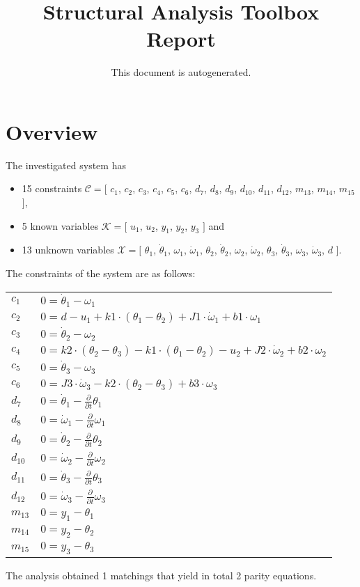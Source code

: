 \documentclass[a4,11pt]{article}
\title{Structural Analysis Toolbox Report}
\author{This document is autogenerated.}
\begin{document}
\maketitle
\section{Overview}
The investigated system has
\begin{itemize}
	\item 15 constraints $\mathcal{C} = [$ $c_1$, $c_2$, $c_3$, $c_4$, $c_5$, $c_6$, $d_7$, $d_8$, $d_9$, $d_{10}$, $d_{11}$, $d_{12}$, $m_{13}$, $m_{14}$, $m_{15}$ $]$,
	\item 5 known variables $\mathcal{K} = [$ $u_1$, $u_2$, $y_1$, $y_2$, $y_3$ $]$ and
	\item 13 unknown variables $\mathcal{X} = [$ $\theta_1$, $\dot{\theta}_1$, $\omega_1$, $\dot{\omega}_1$, $\theta_2$, $\dot{\theta}_2$, $\omega_2$, $\dot{\omega}_2$, $\theta_3$, $\dot{\theta}_3$, $\omega_3$, $\dot{\omega}_3$, $d$ $]$.
\end{itemize}
The constraints of the system are as follows:
\begin{longtable}{ l | p{} }
	$c_1$ & $ 0=\dot{\theta}_1-\omega_1 $ \\
	$c_2$ & $ 0=d-u_1+k1\cdot \left(\theta_1-\theta_2\right)+J1\cdot \dot{\omega}_1+b1\cdot \omega_1 $ \\
	$c_3$ & $ 0=\dot{\theta}_2-\omega_2 $ \\
	$c_4$ & $ 0=k2\cdot \left(\theta_2-\theta_3\right)-k1\cdot \left(\theta_1-\theta_2\right)-u_2+J2\cdot \dot{\omega}_2+b2\cdot \omega_2 $ \\
	$c_5$ & $ 0=\dot{\theta}_3-\omega_3 $ \\
	$c_6$ & $ 0=J3\cdot \dot{\omega}_3-k2\cdot \left(\theta_2-\theta_3\right)+b3\cdot \omega_3 $ \\
	$d_7$ & $ 0=\dot{\theta}_1-\frac{\partial }{\partial t} \theta_1 $ \\
	$d_8$ & $ 0=\dot{\omega}_1-\frac{\partial }{\partial t} \omega_1 $ \\
	$d_9$ & $ 0=\dot{\theta}_2-\frac{\partial }{\partial t} \theta_2 $ \\
	$d_{10}$ & $ 0=\dot{\omega}_2-\frac{\partial }{\partial t} \omega_2 $ \\
	$d_{11}$ & $ 0=\dot{\theta}_3-\frac{\partial }{\partial t} \theta_3 $ \\
	$d_{12}$ & $ 0=\dot{\omega}_3-\frac{\partial }{\partial t} \omega_3 $ \\
	$m_{13}$ & $ 0=y_1-\theta_1 $ \\
	$m_{14}$ & $ 0=y_2-\theta_2 $ \\
	$m_{15}$ & $ 0=y_3-\theta_3 $ \\
\end{longtable}
The analysis obtained 1 matchings that yield in total 2 parity equations.\newpage
\end{document}
